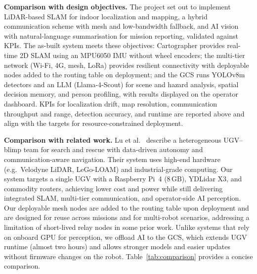 \textbf{Comparison with design objectives.} The project set out to implement LiDAR-based SLAM for indoor localization and mapping, a hybrid communication scheme with mesh and low-bandwidth fallback, and AI vision with natural-language summarisation for mission reporting, validated against KPIs. The as-built system meets these objectives: Cartographer provides real-time 2D SLAM using an MPU6050 IMU without wheel encoders; the multi-tier network (Wi-Fi, 4G, mesh, LoRa) provides resilient connectivity with deployable nodes added to the routing table on deployment; and the GCS runs YOLOv8m detectors \cite{jocher2023yolov8} and an LLM (Llama-4-Scout) for scene and hazard analysis, spatial decision memory, and person profiling, with results displayed on the operator dashboard. KPIs for localization drift, map resolution, communication throughput and range, detection accuracy, and runtime are reported above and align with the targets for resource-constrained deployment.

\textbf{Comparison with related work.} Lu et al.\ \cite{lu2022} describe a heterogeneous UGV--blimp team for search and rescue with data-driven autonomy and communication-aware navigation. Their system uses high-end hardware (e.g.\ Velodyne LiDAR, LeGo-LOAM) and industrial-grade computing. Our system targets a single UGV with a Raspberry Pi~4 (8\,GB), YDLidar X3, and commodity routers, achieving lower cost and power while still delivering integrated SLAM, multi-tier communication, and operator-side AI perception. Our deployable mesh nodes are added to the routing table upon deployment and are designed for reuse across missions and for multi-robot scenarios, addressing a limitation of short-lived relay nodes in some prior work. Unlike systems that rely on onboard GPU for perception, we offload AI to the GCS, which extends UGV runtime (almost two hours) and allows stronger models and easier updates without firmware changes on the robot. Table~\ref{tab:comparison} provides a concise comparison.

